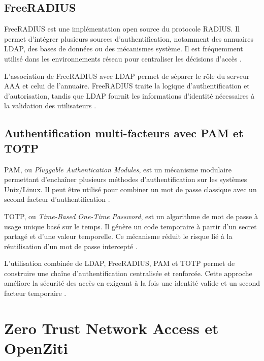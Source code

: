 \documentclass[12pt,a4paper,oneside]{report}
\begin{document}
	\subsection{FreeRADIUS}
	
	FreeRADIUS est une implémentation open source du protocole RADIUS. Il permet d'intégrer plusieurs sources d'authentification, notamment des annuaires LDAP, des bases de données ou des mécanismes système. Il est fréquemment utilisé dans les environnements réseau pour centraliser les décisions d'accès \cite{freeradius_ldap}.
	
	L'association de FreeRADIUS avec LDAP permet de séparer le rôle du serveur AAA et celui de l'annuaire. FreeRADIUS traite la logique d'authentification et d'autorisation, tandis que LDAP fournit les informations d'identité nécessaires à la validation des utilisateurs \cite{freeradius_ldap,rfc4511_ldap}.
	
	\subsection{Authentification multi-facteurs avec PAM et TOTP}
	
	PAM, ou \textit{Pluggable Authentication Modules}, est un mécanisme modulaire permettant d'enchaîner plusieurs méthodes d'authentification sur les systèmes Unix/Linux. Il peut être utilisé pour combiner un mot de passe classique avec un second facteur d'authentification \cite{freeradius_ldap}.
	
	TOTP, ou \textit{Time-Based One-Time Password}, est un algorithme de mot de passe à usage unique basé sur le temps. Il génère un code temporaire à partir d'un secret partagé et d'une valeur temporelle. Ce mécanisme réduit le risque lié à la réutilisation d'un mot de passe intercepté \cite{rfc6238_totp}.
	
	L'utilisation combinée de LDAP, FreeRADIUS, PAM et TOTP permet de construire une chaîne d'authentification centralisée et renforcée. Cette approche améliore la sécurité des accès en exigeant à la fois une identité valide et un second facteur temporaire \cite{rfc2865_radius,rfc6238_totp,freeradius_ldap}.
	
	\section{Zero Trust Network Access et OpenZiti}
	
\end{document}
